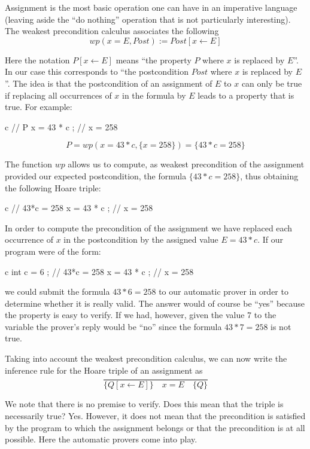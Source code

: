 


Assignment is the most basic operation one can have in an imperative
language (leaving aside the ``do nothing'' operation that is not particularly
interesting). The weakest precondition calculus associates the following
$$wp(x = E , Post) := Post[x \leftarrow E]$$


Here the notation $P[x \leftarrow E]$ means ``the property $P$ where
$x$ is replaced by $E$''. In our case this corresponds to ``the
postcondition $Post$ where $x$ is replaced by $E$''. The idea is
that the postcondition of an assignment of $E$ to $x$ can only be
true if replacing all occurrences of $x$ in the formula by $E$ leads
to a property that is true. For example:



\begin{CodeBlock}{c}
// { P }
x = 43 * c ;
// { x = 258 }
\end{CodeBlock}


$$P = wp(x = 43*c , \{x = 258\}) = \{43*c = 258\}$$


The function $wp$ allows us to compute, as weakest precondition of
the assignment provided our expected postcondition, the formula
$\{43*c = 258\}$, thus obtaining the following Hoare triple:


\begin{CodeBlock}{c}
// { 43*c = 258 }
x = 43 * c ;
// { x = 258 }
\end{CodeBlock}


In order to compute the precondition of the assignment we have replaced
each occurrence of $x$ in the postcondition by the assigned value
$E = 43*c$. If our program were of the form:
\begin{CodeBlock}{c}
int c = 6 ;
// { 43*c = 258 }
x = 43 * c ;
// { x = 258 }
\end{CodeBlock}
we could submit the formula $43*6 = 258$ to our automatic prover
in order to determine whether it is really valid. The answer would of
course be ``yes'' because the property is easy to verify. If we had,
however, given the value 7 to the variable  the prover's reply
would be ``no'' since the formula $43*7 = 258$ is not true.



Taking into account the weakest precondition calculus, we can now write
the inference rule for the Hoare triple of an assignment as
$$\dfrac{}{\{Q[x \leftarrow E] \}\quad x = E \quad\{ Q \}}$$


We note that there is no premise to verify. Does this mean that the
triple is necessarily true? Yes. However, it does not mean that the
precondition is satisfied by the program to which the assignment belongs
or that the precondition is at all possible. Here the automatic provers
come into play.



